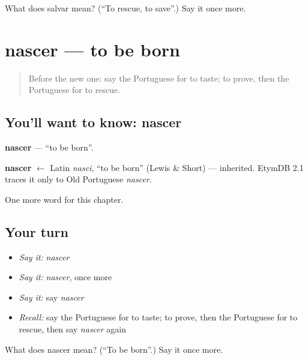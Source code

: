 \begin{tcolorbox}[breakable,colback=teal!4,colframe=teal!35!black,title={Before you move on}]
What does salvar mean? (\textquotedblleft{}To rescue, to save\textquotedblright{}.) Say it once more.
\end{tcolorbox}
\section[nascer]{nascer — to be born}

\label{lesson:PT-C173-nascer}



\begin{quote}
Before the new one: say the Portuguese for to taste; to prove, then the Portuguese for to rescue.
\end{quote}

\subsection*{You'll want to know: nascer}
\textbf{nascer} — \textquotedblleft{}to be born\textquotedblright{}.

\begin{cousinweb}
\textbf{nascer} $\leftarrow$ Latin \emph{nasci}, \textquotedblleft{}to be born\textquotedblright{} (Lewis \& Short) — inherited. EtymDB 2.1 traces it only to Old Portuguese \emph{nascer}.
\end{cousinweb}

\begin{grammarlens}[title={What you've built}]
One more word for this chapter.
\end{grammarlens}

\subsection*{Your turn}
\begin{itemize}
\raggedright
  \item \emph{Say it:} \emph{nascer}
  \item \emph{Say it:} \emph{nascer}, once more
  \item \emph{Say it:} say \emph{nascer}
  \item \emph{Recall:} say the Portuguese for to taste; to prove, then the Portuguese for to rescue, then say \emph{nascer} again
\end{itemize}

\begin{tcolorbox}[breakable,colback=teal!4,colframe=teal!35!black,title={Before you move on}]
What does nascer mean? (\textquotedblleft{}To be born\textquotedblright{}.) Say it once more.
\end{tcolorbox}
